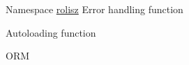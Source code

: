 \label{todo__todo000001}
\hypertarget{todo__todo000001}{}
 
\begin{DoxyDescription}
\item[Namespace \hyperlink{namespacerolisz}{rolisz} ]Error handling function 

Autoloading function 

ORM 
\end{DoxyDescription}